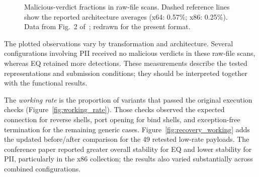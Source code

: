 \documentclass[runningheads]{llncs}
\providecommand{\Description}[1]{}
\begin{document}
\begin{figure}[tbp]
\Description{Malicious-verdict fractions in raw-file scans. Dashed reference lines show the reported architecture averages (x64: 0.57\%; x86: 0.25\%). Orange circles identify x64 and blue squares identify x86.}
\caption{Malicious-verdict fractions in raw-file scans. Dashed reference lines show the reported architecture averages (x64: 0.57\%; x86: 0.25\%). Data from Fig.~2 of~\cite{zone_secrypt_2026}; redrawn for the present format.}
\label{fig:all_payloads}
\end{figure}

The plotted observations vary by transformation and architecture. Several configurations involving PII received no malicious verdicts in these raw-file scans, whereas EQ retained more detections. These measurements describe the tested representations and submission conditions; they should be interpreted together with the functional results.

\label{par:working_rate}
The \emph{working rate} is the proportion of variants that passed the original execution checks (Figure~\ref{fig:working_rate}). Those checks observed the expected connection for reverse shells, port opening for bind shells, and exception-free termination for the remaining generic cases. Figure~\ref{fig:recovery_working} adds the updated before/after comparison for the 49 retested low-rate payloads. The conference paper reported greater overall stability for EQ and lower stability for PII, particularly in the x86 collection; the results also varied substantially across combined configurations.
\end{document}
